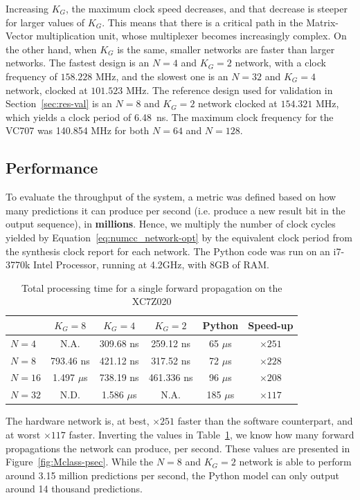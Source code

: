 \documentclass{IEEEtran}
\begin{document}
Increasing $K_G$, the maximum clock speed decreases, and that decrease is steeper for larger values
of $K_G$. This means that there is a critical path in the Matrix-Vector multiplication unit, whose multiplexer becomes
increasingly complex. On the other hand, when $K_G$ is the same, smaller networks are faster
than larger networks. The fastest design is an $N=4$ and $K_G = 2$ network, with a clock frequency of $158.228$ MHz, and
the slowest one is an $N=32$ and $K_G=4$ network, clocked at $101.523$ MHz. The reference design used for validation in
Section~\ref{sec:res-val} is an $N=8$ and $K_G=2$ network clocked at $154.321$ MHz, which yields a clock period of
\SI{6.48}{\nano\second}. The maximum clock frequency for the VC707 was 140.854 MHz for both $N=64$ and $N=128$.


\subsection{Performance}
To evaluate the throughput of the system, a metric was defined based on how many predictions it can produce per second (i.e. produce a new result bit in the output sequence),
in \textbf{millions}. Hence, we multiply the number of clock cycles yielded by Equation~\ref{eq:numcc_network-opt} by the equivalent clock period
from the synthesis clock report for each network. The Python code was run on an i7-3770k Intel Processor, running at 4.2GHz, with 8GB of RAM.

\begin{table}
	\caption{Total processing time for a single forward propagation on the XC7Z020}
	\label{tab:process-time}
    \centering
    \begin{tabular}{ | l | c | c | c | c | c | }
    \hline
    & $K_G=8$  & $K_G=4$ & $K_G=2$ & Python & Speed-up \\
    \hline
    $N=4$ & N.A.  & 309.68 ns  & 259.12 ns & 65 $\mu$s & $\times251$ \\
    \hline
    $N=8$ & 793.46 ns  & 421.12 ns  &  317.52 ns & 72 $\mu$s & $\times228$ \\
    \hline
    $N=16$ & 1.497 $\mu$s  & 738.19 ns  & 461.336 ns & 96 $\mu$s & $\times208$ \\
    \hline
    $N=32$ & N.D.          & 1.586 $\mu$s & N.A.       & 185 $\mu$s  &  $\times117$ \\
		\hline
  \end{tabular}
\end{table}
The hardware network is, at best, $\times251$ faster than the software counterpart,
and at worst $\times117$ faster.
Inverting the values in Table~\ref{tab:process-time}, we know how many forward propagations the network can produce, per second. These values are presented in Figure~\ref{fig:Mclass-psec}.
While the $N=8$ and $K_G=2$ network is able to perform around 3.15 million predictions per second, the Python model can only output around 14 thousand predictions.
\end{document}
